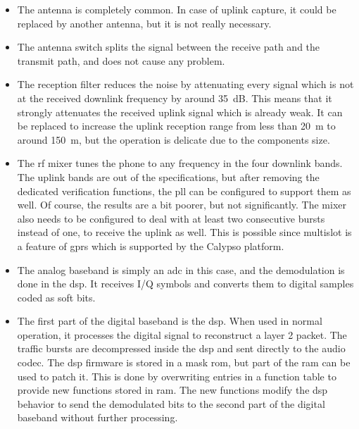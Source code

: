     \begin{itemize}[topsep=-1em,parsep=0em,itemsep=0.5em]

      \item The antenna is completely common. In case of uplink capture,
        it could be replaced by another antenna, but it is not really
        necessary.

      \item The antenna switch splits the signal between the receive
        path and the transmit path, and does not cause any problem.

      \item The reception filter reduces the noise by attenuating every
        signal which is not at the received downlink frequency by around
        \SI{35}{\deci\bel}. This means that it strongly attenuates the
        received uplink signal which is already weak. It can be replaced
        to increase the uplink reception range from less than
        \SI{20}{\meter} to around \SI{150}{\meter}, but the operation is
        delicate due to the components size.

      \item The \gls{rf} mixer tunes the phone to any frequency in the
        four downlink bands. The uplink bands are out of the
        specifications, but after removing the dedicated verification
        functions, the \gls{pll} can be configured to support them as
        well. Of course, the results are a bit poorer, but not
        significantly. The mixer also needs to be configured to deal with at
        least two consecutive bursts instead of one, to receive the
        uplink as well. This is possible since multislot is a feature of
        \gls{gprs} which is supported by the Calypso
        platform.

      \item The analog baseband is simply an \gls{adc} in this case, and
        the demodulation is done in the \gls{dsp}. It receives I/Q
        symbols and converts them to digital samples coded as soft
        bits.

      \item The first part of the digital baseband is the \gls{dsp}.
        When used in normal operation, it processes the digital signal
        to reconstruct a layer 2 packet. The traffic bursts are
        decompressed inside the \gls{dsp} and sent directly to the audio
        codec. The \gls{dsp} firmware is stored in a mask \gls{rom}, but
        part of the \gls{ram} can be used to patch it. This is done by
        overwriting entries in a function table to provide new functions
        stored in \gls{ram}. The new functions modify the \gls{dsp}
        behavior to send the demodulated bits to the second part of the
        digital baseband without further processing.


\end{itemize}
